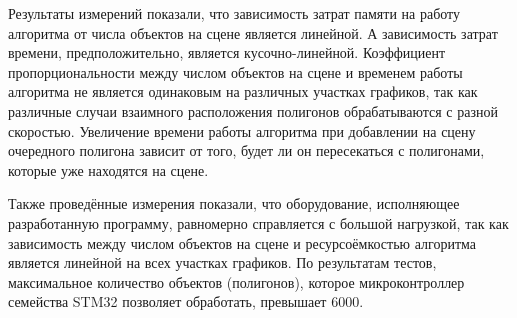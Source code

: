 Результаты измерений показали, что зависимость затрат памяти на работу алгоритма от числа объектов на сцене является линейной. 
А зависимость затрат времени, предположительно, является кусочно-линейной. Коэффициент пропорциональности между числом объектов на сцене 
и временем работы алгоритма не является одинаковым на различных участках графиков, так как различные случаи взаимного расположения 
полигонов обрабатываются с разной скоростью. Увеличение времени работы алгоритма при добавлении на сцену очередного полигона зависит от 
того, будет ли он пересекаться с полигонами, которые уже находятся на сцене.

Также проведённые измерения показали, что оборудование, исполняющее разработанную программу, равномерно справляется с большой нагрузкой, 
так как зависимость между числом объектов на сцене и ресурсоёмкостью алгоритма является линейной на всех участках графиков. По результатам 
тестов, максимальное количество объектов (полигонов), которое микроконтроллер семейства STM32 позволяет обработать, превышает 6000.

